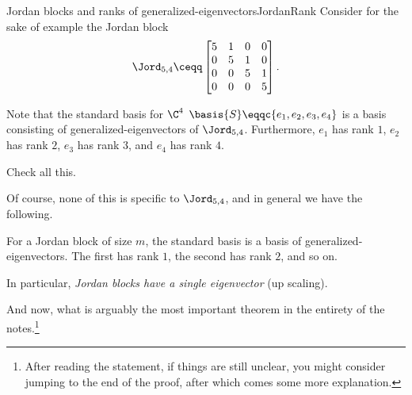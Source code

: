\begin{exm}{Jordan blocks and ranks of generalized-eigenvectors}{JordanRank}
	Consider for the sake of example the Jordan block
	\begin{equation}
		\Jord _{5,4}\ceqq \begin{bmatrix}5 & 1 & 0 & 0 \\ 0 & 5 & 1 & 0 \\ 0 & 0 & 5 & 1 \\ 0 & 0 & 0 & 5\end{bmatrix}.
	\end{equation}
	
	Note that the standard basis for $\C ^4$ $\basis{S}\eqqc \{ e_1,e_2,e_3,e_4\}$ is a basis consisting of generalized-eigenvectors of $\Jord _{5,4}$.  Furthermore, $e_1$ has rank $1$, $e_2$ has rank $2$, $e_3$ has rank $3$, and $e_4$ has rank $4$.
	\begin{exr}[breakable=false]{}{}
		Check all this.
	\end{exr}

	Of course, none of this is specific to $\Jord _{5,4}$, and in general we have the following.
	\begin{displayquote}
		For a Jordan block of size $m$, the standard basis is a basis of generalized-eigenvectors.  The first has rank $1$, the second has rank $2$, and so on.
		
		In particular, \emph{Jordan blocks have a single eigenvector} (up scaling).
	\end{displayquote}
\end{exm}
And now, what is arguably the most important theorem in the entirety of the notes.\footnote{After reading the statement, if things are still unclear, you might consider jumping to the end of the proof, after which comes some more explanation.}
